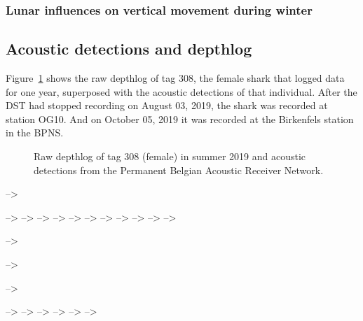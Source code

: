 \documentclass[
  authoryear,
  review,
  3p]{elsarticle}
\begin{document}
\hypertarget{lunar-influences-on-vertical-movement-during-winter-1}{%
\subsubsection{Lunar influences on vertical movement during
winter}\label{lunar-influences-on-vertical-movement-during-winter-1}}

\hypertarget{acoustic-detections-and-depthlog}{%
\subsection{Acoustic detections and
depthlog}\label{acoustic-detections-and-depthlog}}

Figure~\ref{fig-adst308} shows the raw depthlog of tag 308, the female
shark that logged data for one year, superposed with the acoustic
detections of that individual. After the DST had stopped recording on
August 03, 2019, the shark was recorded at station OG10. And on October
05, 2019 it was recorded at the Birkenfels station in the BPNS.

\begin{figure}

\begin{minipage}[t]{\linewidth}

{\centering 


\caption{\label{fig-adst308}Raw depthlog of tag 308 (female) in summer
2019 and acoustic detections from the Permanent Belgian Acoustic
Receiver Network.}

}

\end{minipage}%

\end{figure}

--\textgreater{}

--\textgreater{} --\textgreater{} --\textgreater{} --\textgreater{}
--\textgreater{} --\textgreater{} --\textgreater{} --\textgreater{}
--\textgreater{} --\textgreater{} --\textgreater{}

--\textgreater{}

--\textgreater{}

--\textgreater{}

--\textgreater{} --\textgreater{} --\textgreater{} --\textgreater{}
--\textgreater{} --\textgreater{}
\end{document}
